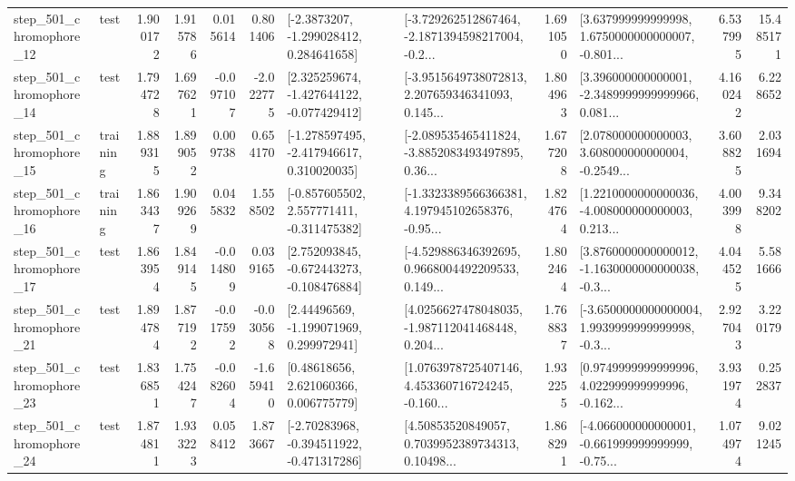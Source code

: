 \begin{tabular}{llrrrrllrlrr}
  step\_501\_chromophore\_12 &      test &      1.900172 &    1.915786 &      0.015614 &  0.801406 &     [-2.3873207, -1.299028412, 0.284641658] &  [-3.729262512867464, -2.1871394598217004, -0.2... &       1.691050 &  [3.637999999999998, 1.6750000000000007, -0.801... &            6.537995 &         15.485171 \\
  step\_501\_chromophore\_14 &      test &      1.794728 &    1.697621 &     -0.097107 & -2.022775 &   [2.325259674, -1.427644122, -0.077429412] &  [-3.9515649738072813, 2.207659346341093, 0.145... &       1.804963 &  [3.396000000000001, -2.3489999999999966, 0.081... &            4.160242 &          6.228652 \\
  step\_501\_chromophore\_15 &  training &      1.889315 &    1.899052 &      0.009738 &  0.654170 &   [-1.278597495, -2.417946617, 0.310020035] &  [-2.089535465411824, -3.8852083493497895, 0.36... &       1.677208 &  [2.078000000000003, 3.608000000000004, -0.2549... &            3.608825 &          2.031694 \\
  step\_501\_chromophore\_16 &  training &      1.863437 &    1.909269 &      0.045832 &  1.558502 &   [-0.857605502, 2.557771411, -0.311475382] &  [-1.3323389566366381, 4.197945102658376, -0.95... &       1.824764 &  [1.2210000000000036, -4.008000000000003, 0.213... &            4.003998 &          9.348202 \\
  step\_501\_chromophore\_17 &      test &      1.863954 &    1.849145 &     -0.014809 &  0.039165 &   [2.752093845, -0.672443273, -0.108476884] &  [-4.529886346392695, 0.9668004492209533, 0.149... &       1.802464 &  [3.8760000000000012, -1.1630000000000038, -0.3... &            4.044525 &          5.581666 \\
  step\_501\_chromophore\_21 &      test &      1.894784 &    1.877192 &     -0.017592 & -0.030568 &     [2.44496569, -1.199071969, 0.299972941] &  [4.0256627478048035, -1.987112041468448, 0.204... &       1.768837 &  [-3.6500000000000004, 1.9939999999999998, -0.3... &            2.927043 &          3.220179 \\
  step\_501\_chromophore\_23 &      test &      1.836851 &    1.754247 &     -0.082604 & -1.659410 &      [0.48618656, 2.621060366, 0.006775779] &  [1.0763978725407146, 4.453360716724245, -0.160... &       1.932255 &  [0.9749999999999996, 4.022999999999996, -0.162... &            3.931974 &          0.252837 \\
  step\_501\_chromophore\_24 &      test &      1.874811 &    1.933223 &      0.058412 &  1.873667 &   [-2.70283968, -0.394511922, -0.471317286] &  [4.50853520849057, 0.7039952389734313, 0.10498... &       1.868291 &  [-4.066000000000001, -0.661999999999999, -0.75... &            1.074974 &          9.021245 \\

\end{tabular}
